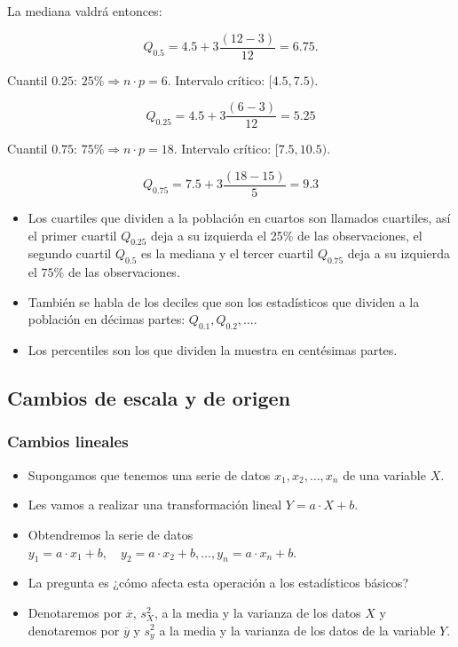 \begin{frame}
La mediana valdrá entonces:

$$Q_{0.5}=4.5+3\frac{(12-3)}{12}=6.75.$$

Cuantil $0.25$: $25\mbox{\%}\Rightarrow  n\cdot p= 6$. Intervalo crítico:
 $[4.5,7.5)$.

$$Q_{0.25}=4.5+3\frac{(6-3)}{12}=5.25$$

Cuantil $0.75$: $75\mbox{\%} \Rightarrow  n\cdot p= 18$. Intervalo crítico:
 $[7.5,10.5)$.

$$
Q_{0.75}=7.5+3\frac{(18-15)}{5}=9.3
$$
\end{frame}

\begin{frame}
\begin{itemize}
\item Los cuartiles
que dividen a la población en cuartos son llamados cuartiles, así el primer cuartil $Q_{0.25}$
deja a su izquierda el 25\% de las observaciones, el segundo cuartil $Q_{0.5}$ es la mediana
y el tercer cuartil $Q_{0.75}$ deja a su izquierda el $75\%$ de las observaciones.
\item  También se
habla de los deciles que son los estadísticos que dividen a la población en décimas
partes: $Q_{0.1}, Q_{0.2},\ldots$.
\item Los percentiles son los que dividen la muestra en centésimas partes.
\end{itemize}
\end{frame}

\subsection{Cambios de escala y de origen}

\begin{frame}
\frametitle{Cambios lineales}
\begin{itemize}
\item Supongamos que tenemos una serie de datos $x_1,x_2,\ldots,x_n$ de una variable $X$.
\item Les vamos a realizar una transformación lineal $Y=a\cdot X+b$.
\item Obtendremos la serie de datos $y_1=a \cdot x_1+b,\quad y_2=a \cdot x_2+b,\ldots, y_n=a \cdot x_n+b$.
\item La pregunta es ¿cómo afecta esta operación a los estadísticos básicos?
\item Denotaremos por $\overline{x}$, $s_X^2$, a la media y la varianza de los datos $X$ y  denotaremos por $\overline{y}$  y $s_y^2$
a la media y la varianza de los datos de la  variable $Y$.
\end{itemize}
\end{frame}


